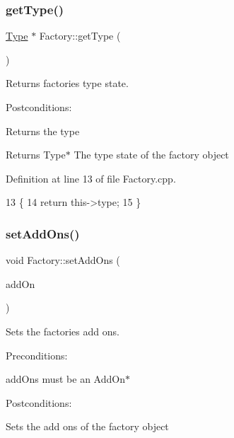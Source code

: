 \subsubsection{\texorpdfstring{get\+Type()}{getType()}}
{\footnotesize\ttfamily \hyperlink{classType}{Type} $\ast$ Factory\+::get\+Type (\begin{DoxyParamCaption}{ }\end{DoxyParamCaption})}



Returns factories type state. 

Postconditions\+:
\begin{DoxyItemize}
\item Returns the type
\end{DoxyItemize}

\begin{DoxyReturn}{Returns}
Type$\ast$ The type state of the factory object 
\end{DoxyReturn}


Definition at line 13 of file Factory.\+cpp.


\begin{DoxyCode}
13                        \{
14     \textcolor{keywordflow}{return} this->type;
15 \}
\end{DoxyCode}
\mbox{\label{classFactory_a58dbf2659ee06c61b2dae1a9a36fac53}} 
\subsubsection{\texorpdfstring{set\+Add\+Ons()}{setAddOns()}}
{\footnotesize\ttfamily void Factory\+::set\+Add\+Ons (\begin{DoxyParamCaption}\item[{\hyperlink{classAddOn}{Add\+On} $\ast$}]{add\+On }\end{DoxyParamCaption})}



Sets the factories add ons. 

Preconditions\+:
\begin{DoxyItemize}
\item add\+Ons must be an Add\+On$\ast$
\end{DoxyItemize}

Postconditions\+:
\begin{DoxyItemize}
\item Sets the add ons of the factory object
\end{DoxyItemize}



